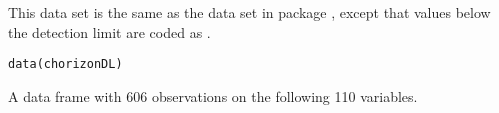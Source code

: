 %
\begin{Description}\relax
This data set is the same as the  
data set in package , except that values below the 
detection limit are coded as .
\end{Description}
%
\begin{Usage}
\begin{verbatim}
data(chorizonDL)
\end{verbatim}
\end{Usage}
%
\begin{Format}
A data frame with 606 observations on the following 110 variables.
\begin{description}


\end{description}
\end{Format}
